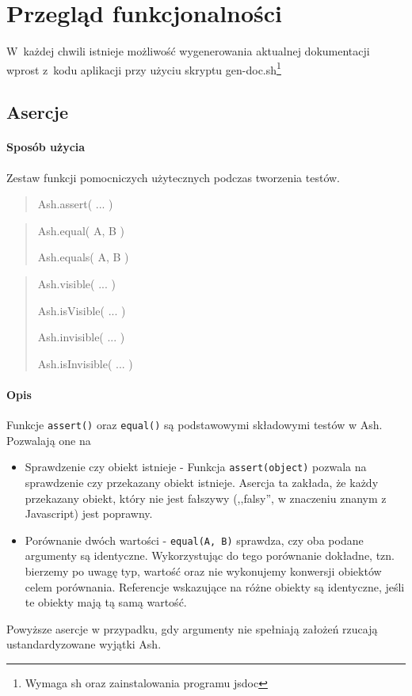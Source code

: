 \documentclass[brudnopis]{xmgr}
\begin{document}
\chapter{Przegląd funkcjonalności}

W~każdej chwili istnieje możliwość wygenerowania aktualnej dokumentacji wprost z~kodu aplikacji przy użyciu skryptu gen-doc.sh\footnote{Wymaga sh oraz zainstalowania programu jsdoc}

\section{Asercje}

\subsubsection{Sposób użycia}

Zestaw funkcji pomocniczych użytecznych podczas tworzenia testów.

\begin{quote}
Ash.assert( ... ) 
\end{quote}

\begin{quote}
Ash.equal( A, B )

Ash.equals( A, B ) 
\end{quote}

\begin{quote}
Ash.visible( ... ) 

Ash.isVisible( ... )

Ash.invisible( ... )

Ash.isInvisible( ... )
\end{quote}

\subsubsection{Opis}

Funkcje \texttt{assert()} oraz \texttt{equal()} są podstawowymi składowymi testów w Ash. Pozwalają one na 

\begin{itemize}
  \item Sprawdzenie czy obiekt istnieje - Funkcja \texttt{assert(object)} pozwala na sprawdzenie czy przekazany obiekt istnieje. Asercja ta zakłada, że każdy przekazany obiekt, który nie jest fałszywy (,,falsy'', w znaczeniu znanym z Javascript) jest poprawny. 
  \item Porównanie dwóch wartości - \texttt{equal(A, B)} sprawdza, czy oba podane argumenty są identyczne. Wykorzystując do tego porównanie dokładne, tzn. bierzemy po uwagę typ, wartość oraz nie wykonujemy konwersji obiektów celem porównania. Referencje wskazujące na różne obiekty są identyczne, jeśli te obiekty mają tą samą wartość.
\end{itemize}
Powyższe asercje w przypadku, gdy argumenty nie spełniają założeń rzucają ustandardyzowane wyjątki Ash. 
\end{document}

